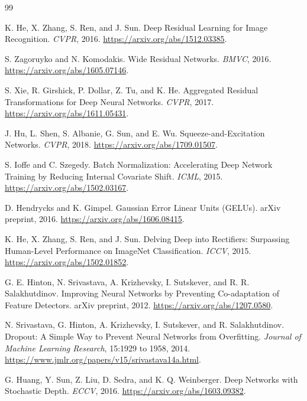 \documentclass[11pt]{article}
\begin{document}
\clearpage
\begin{thebibliography}{99}

K. He, X. Zhang, S. Ren, and J. Sun.
\newblock Deep Residual Learning for Image Recognition.
\newblock \emph{CVPR}, 2016.
\newblock \url{https://arxiv.org/abs/1512.03385}.

S. Zagoruyko and N. Komodakis.
\newblock Wide Residual Networks.
\newblock \emph{BMVC}, 2016.
\newblock \url{https://arxiv.org/abs/1605.07146}.

S. Xie, R. Girshick, P. Dollar, Z. Tu, and K. He.
\newblock Aggregated Residual Transformations for Deep Neural Networks.
\newblock \emph{CVPR}, 2017.
\newblock \url{https://arxiv.org/abs/1611.05431}.

J. Hu, L. Shen, S. Albanie, G. Sun, and E. Wu.
\newblock Squeeze-and-Excitation Networks.
\newblock \emph{CVPR}, 2018.
\newblock \url{https://arxiv.org/abs/1709.01507}.

S. Ioffe and C. Szegedy.
\newblock Batch Normalization: Accelerating Deep Network Training by Reducing
Internal Covariate Shift.
\newblock \emph{ICML}, 2015.
\newblock \url{https://arxiv.org/abs/1502.03167}.

D. Hendrycks and K. Gimpel.
\newblock Gaussian Error Linear Units (GELUs).
\newblock arXiv preprint, 2016.
\newblock \url{https://arxiv.org/abs/1606.08415}.

K. He, X. Zhang, S. Ren, and J. Sun.
\newblock Delving Deep into Rectifiers: Surpassing Human-Level Performance on
ImageNet Classification.
\newblock \emph{ICCV}, 2015.
\newblock \url{https://arxiv.org/abs/1502.01852}.

G. E. Hinton, N. Srivastava, A. Krizhevsky, I. Sutskever, and R. R. Salakhutdinov.
\newblock Improving Neural Networks by Preventing Co-adaptation of Feature
Detectors.
\newblock arXiv preprint, 2012.
\newblock \url{https://arxiv.org/abs/1207.0580}.

N. Srivastava, G. Hinton, A. Krizhevsky, I. Sutskever, and R. Salakhutdinov.
\newblock Dropout: A Simple Way to Prevent Neural Networks from Overfitting.
\newblock \emph{Journal of Machine Learning Research}, 15:1929 to 1958, 2014.
\newblock \url{https://www.jmlr.org/papers/v15/srivastava14a.html}.

G. Huang, Y. Sun, Z. Liu, D. Sedra, and K. Q. Weinberger.
\newblock Deep Networks with Stochastic Depth.
\newblock \emph{ECCV}, 2016.
\newblock \url{https://arxiv.org/abs/1603.09382}.


\end{thebibliography}
\end{document}
